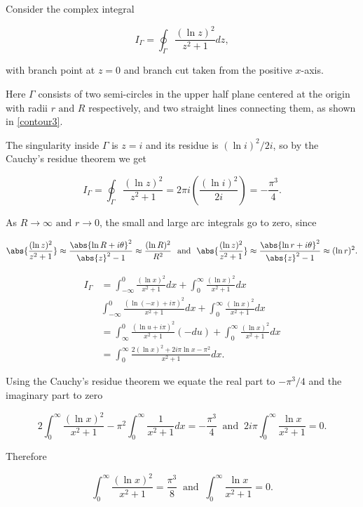 \documentclass[english,a4paper,12pt]{report}
\begin{document}
{Consider the complex integral 

\begin{equation}
    I_{\Gamma } = \oint_{\Gamma } \frac{(\ln z)^2}{z^2+1} dz, 
\end{equation}

with branch point at \(z = 0\) and branch cut taken from the positive \(x\)-axis. 

Here \(\Gamma \) consists of two semi-circles in the upper half plane centered at the origin with radii \(r \text { and } R\) respectively, and two straight lines connecting them, as shown in \cref{contour3}.  

The singularity inside \(\Gamma \) is \(z = i\) and its residue is \((\ln i)^2/2i\), so by the Cauchy's residue theorem we get 

\begin{equation}
    I_{\Gamma } = \oint_{\Gamma } \frac{(\ln z)^2}{z^2+1} = 2\pi i \left( \frac{(\ln i)^2}{2i}  \right)  = -\frac{\pi ^3 }{4}. 
\end{equation}

As \(R \to \infty \text { and } r \to 0\), the small and large arc integrals go to zero, since

\begin{equation}
    \abs{\frac{(\ln z)^2}{z^2+1} } \approx  \frac{\abs{\ln R + i \theta } ^2}{\abs{z}^2-1 } \approx \frac{(\ln R)^2}{R^2} ~\text { and }~ \abs{\frac{(\ln z)^2}{z^2+1} } \approx  \frac{\abs{\ln r + i \theta } ^2}{\abs{z}^2-1 } \approx (\ln r)^2.
\end{equation}

\begin{equation}
    \begin{aligned} 
    I_{\Gamma } &= \int_{-\infty}^{0} \frac{(\ln x)^2}{x^2+1}dx + \int_{0}^{\infty} \frac{(\ln x)^2}{x^2+1}dx \\
    & \int_{-\infty}^{0} \frac{(\ln (-x) + i\pi )^2}{x^2+1}dx +  \int_{0}^{\infty} \frac{(\ln x)^2}{x^2+1}dx \\
    &= \int_{\infty}^{0}\frac{(\ln u + i\pi )^2}{x^2+1}(-du) + \int_{0}^{\infty} \frac{(\ln x)^2}{x^2+1}dx \\
    &= \int_{0}^{\infty} \frac{2(\ln x)^2 + 2i\pi \ln x - \pi ^2}{x^2+1}dx.   
    \end{aligned}                
\end{equation}

Using the Cauchy's residue theorem we equate the real part to \(-\pi ^3 /4\) and the imaginary part to zero 

\begin{equation}
    2 \int_{0}^{\infty} \frac{(\ln x)^2}{x^2+1} - \pi ^2 \int_{0}^{\infty} \frac{1}{x^2+1}dx = -\frac{\pi ^3 }{4} ~\text { and }~ 2i\pi \int_{0}^{\infty} \frac{\ln x}{x^2+1} = 0.         
\end{equation}

Therefore 

\begin{equation}
    \int_{0}^{\infty} \frac{(\ln x)^2}{x^2+1} = \frac{\pi ^3 }{8} ~\text { and }~ \int_{0}^{\infty} \frac{\ln x}{x^2+1} = 0.      
\end{equation}
~
} 
\end{document}
